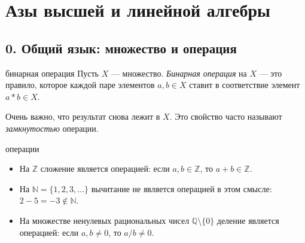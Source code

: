 
\providecommand{\R}{\mathbb{R}}
\providecommand{\Q}{\mathbb{Q}}
\providecommand{\Z}{\mathbb{Z}}
\providecommand{\N}{\mathbb{N}}
\providecommand{\F}{\mathbb{F}}
\providecommand{\Span}{\operatorname{span}}
\providecommand{\Lin}{\operatorname{Lin}}


\chapter*{Азы высшей и линейной алгебры}

\section*{0. Общий язык: множество и операция}

\begin{defbox}{бинарная операция}
Пусть $X$ --- множество. \emph{Бинарная операция} на $X$ --- это правило, которое каждой паре элементов $a,b\in X$ ставит в соответствие элемент $a*b\in X$.

Очень важно, что результат снова лежит в $X$. Это свойство часто называют \emph{замкнутостью} операции.
\end{defbox}

\begin{examplebox}{операции}
\begin{itemize}
    \item На $\Z$ сложение является операцией: если $a,b\in\Z$, то $a+b\in\Z$.
    \item На $\N=\{1,2,3,\ldots\}$ вычитание не является операцией в этом смысле: $2-5=-3\notin\N$.
    \item На множестве ненулевых рациональных чисел $\Q\setminus\{0\}$ деление является операцией: если $a,b\ne 0$, то $a/b\ne 0$.
\end{itemize}
\end{examplebox}

